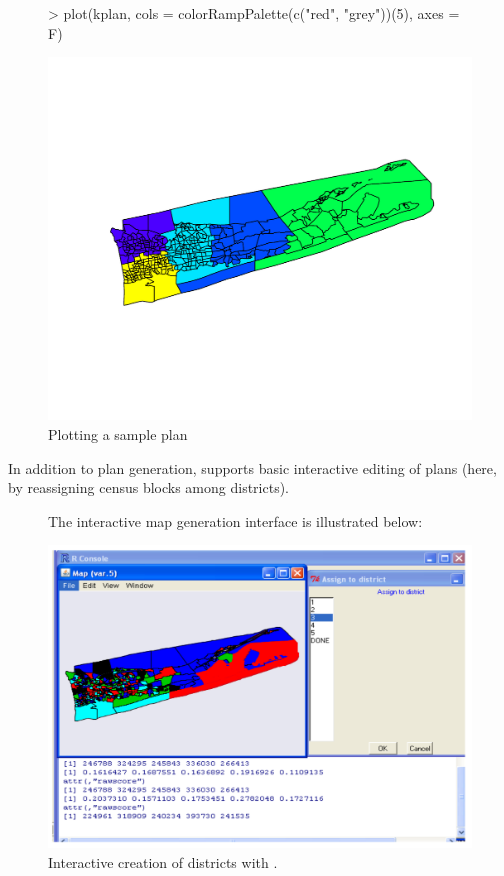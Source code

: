 \documentclass[article]{JSSstyle/jss}
\begin{document}
  \begin{figure}[!h]
\begin{Schunk}
\begin{Sinput}
> plot(kplan, cols = colorRampPalette(c("red", "grey"))(5), axes = F)
\end{Sinput}
\end{Schunk}
\includegraphics{bardJSS-plot1a}
  \caption{\label{fig:rplot1} Plotting a sample plan}
  \end{figure}

\newpage
In addition to plan generation,  supports basic interactive editing of plans (here, by reassigning census blocks among districts).

\begin{figure}[!h]
  The interactive map generation interface is illustrated below:
  \begin{center}
    \includegraphics[page=1]{edit_map.pdf}
  \end{center}

  \caption{\small Interactive creation of districts with .}
  \label{fig:edit}
\end{figure}
\newpage
\end{document}
